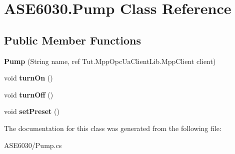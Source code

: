 \hypertarget{class_a_s_e6030_1_1_pump}{}\section{A\+S\+E6030.\+Pump Class Reference}
\label{class_a_s_e6030_1_1_pump}
\subsection*{Public Member Functions}
\begin{DoxyCompactItemize}
\item 
\mbox{\label{class_a_s_e6030_1_1_pump_ac23356a1375f9dc895beeb922721635d}} 
{\bfseries Pump} (String name, ref Tut.\+Mpp\+Opc\+Ua\+Client\+Lib.\+Mpp\+Client client)
\item 
\mbox{\label{class_a_s_e6030_1_1_pump_a80e39e01a6a3fdf187f743991004c4ed}} 
void {\bfseries turn\+On} ()
\item 
\mbox{\label{class_a_s_e6030_1_1_pump_aeaca891e7c6220bf12e070c4096c8140}} 
void {\bfseries turn\+Off} ()
\item 
\mbox{\label{class_a_s_e6030_1_1_pump_a25c0c51e6e9fbddecdf94f3523b971ad}} 
void {\bfseries set\+Preset} ()
\end{DoxyCompactItemize}


The documentation for this class was generated from the following file\+:\begin{DoxyCompactItemize}
\item 
A\+S\+E6030/Pump.\+cs\end{DoxyCompactItemize}
